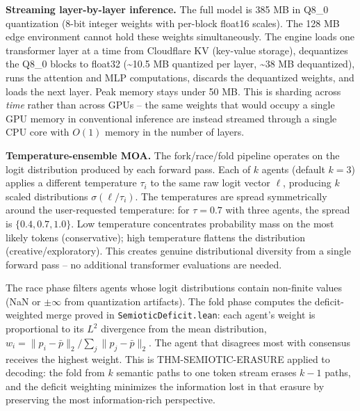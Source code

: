 \documentclass[
  11pt,
]{article}
\begin{document}
\textbf{Streaming layer-by-layer inference.} The full model is 385 MB in
Q8\_0 quantization (8-bit integer weights with per-block float16
scales). The 128 MB edge environment cannot hold these weights
simultaneously. The engine loads one transformer layer at a time from
Cloudflare KV (key-value storage), dequantizes the Q8\_0 blocks to
float32 (\textasciitilde10.5 MB quantized per layer, \textasciitilde38
MB dequantized), runs the attention and MLP computations, discards the
dequantized weights, and loads the next layer. Peak memory stays under
50 MB. This is sharding across \emph{time} rather than across GPUs --
the same weights that would occupy a single GPU memory in conventional
inference are instead streamed through a single CPU core with \(O(1)\)
memory in the number of layers.

\textbf{Temperature-ensemble MOA.} The fork/race/fold pipeline operates
on the logit distribution produced by each forward pass. Each of \(k\)
agents (default \(k = 3\)) applies a different temperature \(\tau_i\) to
the same raw logit vector \(\ell\), producing \(k\) scaled distributions
\(\sigma(\ell / \tau_i)\). The temperatures are spread symmetrically
around the user-requested temperature: for \(\tau = 0.7\) with three
agents, the spread is \(\{0.4, 0.7, 1.0\}\). Low temperature
concentrates probability mass on the most likely tokens (conservative);
high temperature flattens the distribution (creative/exploratory). This
creates genuine distributional diversity from a single forward pass --
no additional transformer evaluations are needed.

The race phase filters agents whose logit distributions contain
non-finite values (NaN or \(\pm\infty\) from quantization artifacts).
The fold phase computes the deficit-weighted merge proved in
\texttt{SemioticDeficit.lean}: each agent's weight is proportional to
its \(L^2\) divergence from the mean distribution,
\(w_i = \|p_i - \bar{p}\|_2 / \sum_j \|p_j - \bar{p}\|_2\). The agent
that disagrees most with consensus receives the highest weight. This is
THM-SEMIOTIC-ERASURE applied to decoding: the fold from \(k\) semantic
paths to one token stream erases \(k - 1\) paths, and the deficit
weighting minimizes the information lost in that erasure by preserving
the most information-rich perspective.
\end{document}
